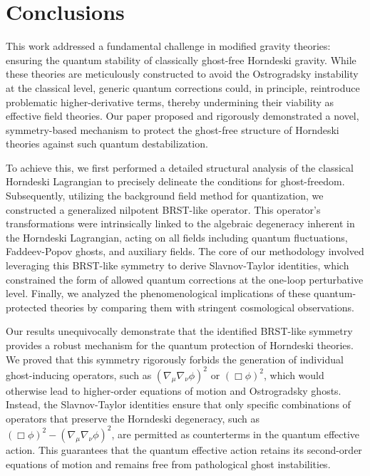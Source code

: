 \documentclass[twocolumn]{aastex631}
\begin{document}
\section{Conclusions}
\label{sec:conclusions}
This work addressed a fundamental challenge in modified gravity theories: ensuring the quantum stability of classically ghost-free Horndeski gravity. While these theories are meticulously constructed to avoid the Ostrogradsky instability at the classical level, generic quantum corrections could, in principle, reintroduce problematic higher-derivative terms, thereby undermining their viability as effective field theories. Our paper proposed and rigorously demonstrated a novel, symmetry-based mechanism to protect the ghost-free structure of Horndeski theories against such quantum destabilization.

To achieve this, we first performed a detailed structural analysis of the classical Horndeski Lagrangian to precisely delineate the conditions for ghost-freedom. Subsequently, utilizing the background field method for quantization, we constructed a generalized nilpotent BRST-like operator. This operator's transformations were intrinsically linked to the algebraic degeneracy inherent in the Horndeski Lagrangian, acting on all fields including quantum fluctuations, Faddeev-Popov ghosts, and auxiliary fields. The core of our methodology involved leveraging this BRST-like symmetry to derive Slavnov-Taylor identities, which constrained the form of allowed quantum corrections at the one-loop perturbative level. Finally, we analyzed the phenomenological implications of these quantum-protected theories by comparing them with stringent cosmological observations.

Our results unequivocally demonstrate that the identified BRST-like symmetry provides a robust mechanism for the quantum protection of Horndeski theories. We proved that this symmetry rigorously forbids the generation of individual ghost-inducing operators, such as $ (\nabla_\mu\nabla_\nu\phi)^2 $ or $ (\Box\phi)^2 $, which would otherwise lead to higher-order equations of motion and Ostrogradsky ghosts. Instead, the Slavnov-Taylor identities ensure that only specific combinations of operators that preserve the Horndeski degeneracy, such as $ (\Box\phi)^2 - (\nabla_\mu\nabla_\nu\phi)^2 $, are permitted as counterterms in the quantum effective action. This guarantees that the quantum effective action retains its second-order equations of motion and remains free from pathological ghost instabilities.
\end{document}
